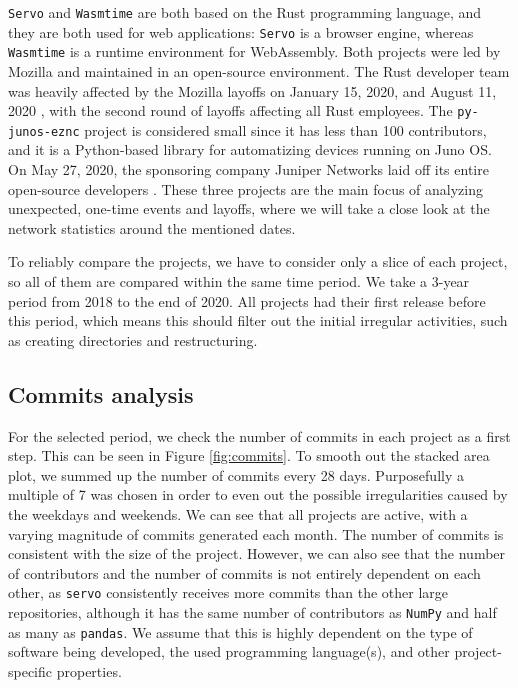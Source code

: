 \texttt{Servo} and \texttt{Wasmtime} are both based on the Rust programming language, and they are both used for web applications: \texttt{Servo} is a browser engine, whereas \texttt{Wasmtime} is a runtime environment for WebAssembly. Both projects were led by Mozilla and maintained in an open-source environment. The Rust developer team was heavily affected by the Mozilla layoffs on January 15, 2020, and August 11, 2020 \cite{lardinoisMozillaLays70,kastrenakesMozillaLaying2502020}, with the second round of layoffs affecting all Rust employees. The \texttt{py-junos-eznc} project is considered small since it has less than 100 contributors, and it is a Python-based library for automatizing devices running on Juno OS. On May 27, 2020, the sponsoring company Juniper Networks laid off its entire open-source developers \cite{brasseurFarewellJuniperNetworks2020}. These three projects are the main focus of analyzing unexpected, one-time events and layoffs, where we will take a close look at the network statistics around the mentioned dates.

To reliably compare the projects, we have to consider only a slice of each project, so all of them are compared within the same time period. We take a 3-year period from 2018 to the end of 2020. All projects had their first release before this period, which means this should filter out the initial irregular activities, such as creating directories and restructuring.

\subsection{Commits analysis}

For the selected period, we check the number of commits in each project as a first step. This can be seen in Figure \ref{fig:commits}. To smooth out the stacked area plot, we summed up the number of commits every 28 days. Purposefully a multiple of 7 was chosen in order to even out the possible irregularities caused by the weekdays and weekends. We can see that all projects are active, with a varying magnitude of commits generated each month. The number of commits is consistent with the size of the project. However, we can also see that the number of contributors and the number of commits is not entirely dependent on each other, as \texttt{servo} consistently receives more commits than the other large repositories, although it has the same number of contributors as \texttt{NumPy} and half as many as \texttt{pandas}. We assume that this is highly dependent on the type of software being developed, the used programming language(s), and other project-specific properties.

